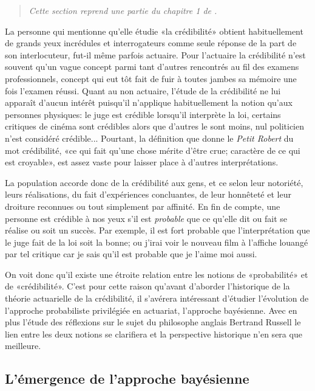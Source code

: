 \begin{quote}
  \itshape Cette section reprend une partie du chapitre 1 de
  \cite{Goulet:masters}.
\end{quote}

La personne qui mentionne qu'elle étudie «la crédibilité» obtient
habituellement de grands yeux incrédules et interrogateurs comme seule
réponse de la part de son interlocuteur, fut-il même parfois actuaire.
Pour l'actuaire la crédibilité n'est souvent qu'un vague concept parmi
tant d'autres rencontrés au fil des examens professionnels, concept
qui eut tôt fait de fuir à toutes jambes sa mémoire une fois l'examen
réussi. Quant au non actuaire, l'étude de la crédibilité ne lui
apparaît d'aucun intérêt puisqu'il n'applique habituellement la notion
qu'aux personnes physiques: le juge est crédible lorsqu'il interprète
la loi, certains critiques de cinéma sont crédibles alors que d'autres
le sont moins, nul politicien n'est considéré crédible... Pourtant, la
définition que donne le \emph{Petit Robert} du mot crédibilité, «ce
qui fait qu'une chose mérite d'être crue; caractère de ce qui est
croyable», est assez vaste pour laisser place à d'autres
interprétations.

La population accorde donc de la crédibilité aux gens, et ce selon
leur notoriété, leurs réalisations, du fait d'expériences concluantes,
de leur honnêteté et leur droiture reconnues ou tout simplement par
affinité. En fin de compte, une personne est crédible à nos yeux s'il
est \emph{probable} que ce qu'elle dit ou fait se réalise ou soit un
succès. Par exemple, il est fort probable que l'interprétation que le
juge fait de la loi soit la bonne; ou j'irai voir le nouveau film à
l'affiche louangé par tel critique car je sais qu'il est probable que
je l'aime moi aussi.

On voit donc qu'il existe une étroite relation entre les notions de
«probabilité» et de «crédibilité». C'est pour cette raison qu'avant
d'aborder l'historique de la théorie actuarielle de la crédibilité, il
s'avérera intéressant d'étudier l'évolution de l'approche probabiliste
privilégiée en actuariat, l'approche bayésienne. Avec en plus l'étude
des réflexions sur le sujet du philosophe anglais Bertrand Russell le
lien entre les deux notions se clarifiera et la perspective historique
n'en sera que meilleure.

\subsection{L'émergence de l'approche bayésienne}
\label{sec:introduction-historique:historique:emergence}

